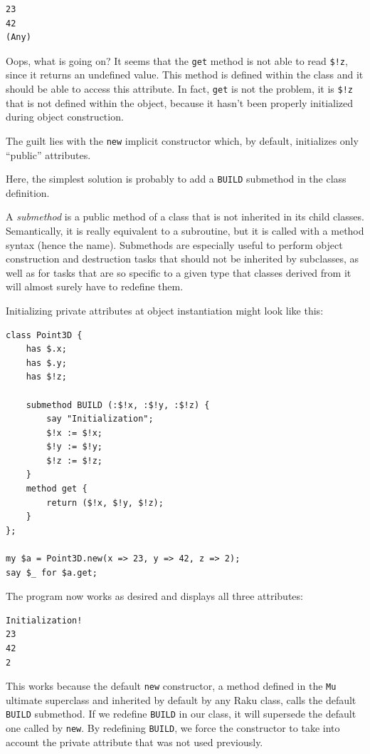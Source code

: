 \begin{verbatim}
23
42
(Any)
\end{verbatim}

Oops, what is going on? It seems that the {\tt get} 
method is not able to read \verb'$!z', since it returns 
an undefined value. This method is defined within the 
class and it should be able to access this attribute. In 
fact, {\tt get} is not the problem, it is \verb'$!z' that is 
not defined within the object, because it hasn't been properly 
initialized during object construction.

The guilt lies with the {\tt new} implicit constructor which, 
by default, initializes only ``public'' attributes.

Here, the simplest solution is probably to add a {\tt BUILD} 
submethod in the class definition.

A \emph{submethod} is a public method of a class that is not inherited 
in its child classes. Semantically, it is really equivalent 
to a subroutine, but it is called with a method syntax (hence 
the name). Submethods are especially useful to perform object 
construction and destruction tasks that should not be 
inherited by subclasses, as well as for tasks that are 
so specific to a given type that classes derived from it  
will almost surely have to redefine them.

Initializing private attributes at object instantiation 
might look like this:

\begin{verbatim}
class Point3D {
    has $.x;
    has $.y;
    has $!z;

    submethod BUILD (:$!x, :$!y, :$!z) {
        say "Initialization";
        $!x := $!x; 
        $!y := $!y; 
        $!z := $!z;
    }
    method get {
        return ($!x, $!y, $!z);
    }
};

my $a = Point3D.new(x => 23, y => 42, z => 2);
say $_ for $a.get;
\end{verbatim}

The program now works as desired and displays all 
three attributes:

\begin{verbatim}
Initialization!
23
42
2
\end{verbatim}

This works because the default {\tt new} constructor, a method 
defined in the {\tt Mu} ultimate superclass and inherited by 
default by any Raku class, calls 
the default {\tt BUILD} submethod. If we redefine {\tt BUILD} 
in our class, it will supersede the default one 
called by {\tt new}. By redefining {\tt BUILD}, we force 
the constructor to take into account the private attribute that 
was not used previously.

